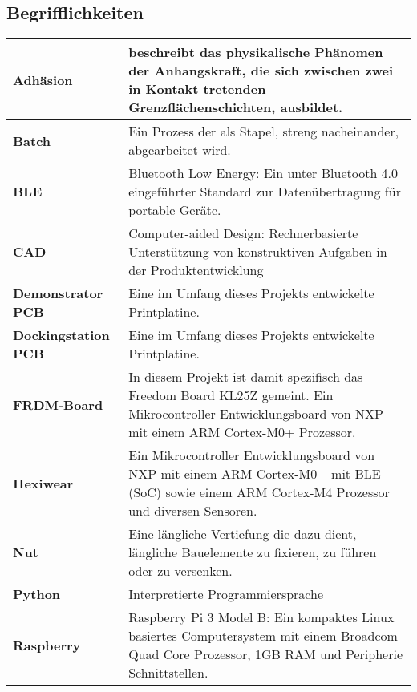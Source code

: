 \subsection*{Begrifflichkeiten}
\begin{table}[H]
	
	\begin{tabular}{|L{4.5cm}|L{11cm}|}
		\hline
		\textbf{Adhäsion} & beschreibt das physikalische Phänomen der Anhangskraft, die sich zwischen zwei in Kontakt tretenden Grenzflächenschichten, ausbildet. \\
		
		\hline
		\textbf{Batch} & Ein Prozess der als Stapel, streng nacheinander, abgearbeitet wird.  \\
		
		\hline
		\textbf{BLE} & Bluetooth Low Energy: Ein unter Bluetooth 4.0 eingeführter Standard zur Datenübertragung für portable Geräte.\\
		
		\hline
		\textbf{CAD} & Computer-aided Design: Rechnerbasierte Unterstützung von konstruktiven Aufgaben in der Produktentwicklung \\
		
		\hline		
		\textbf{Demonstrator PCB} & Eine im Umfang dieses Projekts entwickelte Printplatine.\\
		
		\hline		
		\textbf{Dockingstation PCB} & Eine im Umfang dieses Projekts entwickelte Printplatine.\\
		
		\hline		
		\textbf{FRDM-Board} & In diesem Projekt ist damit spezifisch das Freedom Board KL25Z gemeint. Ein Mikrocontroller Entwicklungsboard von NXP mit einem ARM Cortex-M0+ Prozessor. \\
		
		\hline
		\textbf{Hexiwear} & Ein Mikrocontroller Entwicklungsboard von NXP mit einem ARM Cortex-M0+ mit BLE (SoC) sowie einem ARM Cortex-M4 Prozessor und diversen Sensoren.\\
		
		\hline
		\textbf{Nut} &  Eine längliche Vertiefung die dazu dient,  längliche Bauelemente zu fixieren, zu führen oder zu versenken.\\	
			
		\hline
		\textbf{Python} & Interpretierte Programmiersprache \\
		
		\hline		
		\textbf{Raspberry} & Raspberry Pi 3 Model B: Ein kompaktes Linux basiertes Computersystem mit einem Broadcom Quad Core Prozessor, 1GB RAM und Peripherie Schnittstellen. \\	
		

\end{tabular}
\end{table}

